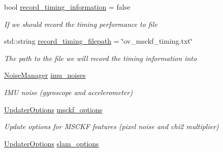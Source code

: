 \begin{DoxyCompactItemize}
bool \hyperlink{structov__msckf_1_1VioManagerOptions_af1c76781e016ae09e49bd4d8e42006e6}{record\+\_\+timing\+\_\+information} = false
\begin{DoxyCompactList}\small\item\em If we should record the timing performance to file \end{DoxyCompactList}\item 
\mbox{\label{structov__msckf_1_1VioManagerOptions_a3cd20d912a15dc8cbe4b71a5bb9daf89}} 
std\+::string \hyperlink{structov__msckf_1_1VioManagerOptions_a3cd20d912a15dc8cbe4b71a5bb9daf89}{record\+\_\+timing\+\_\+filepath} = \char`\"{}ov\+\_\+msckf\+\_\+timing.\+txt\char`\"{}
\begin{DoxyCompactList}\small\item\em The path to the file we will record the timing information into \end{DoxyCompactList}\item 
\mbox{\label{structov__msckf_1_1VioManagerOptions_a5c6a088515a0b5440e8ae7987ea70593}} 
\hyperlink{structov__msckf_1_1NoiseManager}{Noise\+Manager} \hyperlink{structov__msckf_1_1VioManagerOptions_a5c6a088515a0b5440e8ae7987ea70593}{imu\+\_\+noises}
\begin{DoxyCompactList}\small\item\em I\+MU noise (gyroscope and accelerometer) \end{DoxyCompactList}\item 
\mbox{\label{structov__msckf_1_1VioManagerOptions_a8e9f183d26954a03cd2da0511d96b0f3}} 
\hyperlink{structov__msckf_1_1UpdaterOptions}{Updater\+Options} \hyperlink{structov__msckf_1_1VioManagerOptions_a8e9f183d26954a03cd2da0511d96b0f3}{msckf\+\_\+options}
\begin{DoxyCompactList}\small\item\em Update options for M\+S\+C\+KF features (pixel noise and chi2 multiplier) \end{DoxyCompactList}\item 
\mbox{\label{structov__msckf_1_1VioManagerOptions_a3972f04e248b39ee50d7a6ef5dfbc086}} 
\hyperlink{structov__msckf_1_1UpdaterOptions}{Updater\+Options} \hyperlink{structov__msckf_1_1VioManagerOptions_a3972f04e248b39ee50d7a6ef5dfbc086}{slam\+\_\+options}

\end{DoxyCompactItemize}
